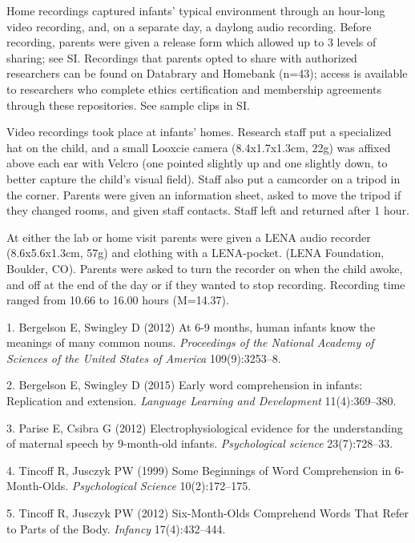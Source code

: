 \documentclass[9pt,twocolumn,twoside,]{pnas-new}
\begin{document}
Home recordings captured infants' typical environment through an
hour-long video recording, and, on a separate day, a daylong audio
recording. Before recording, parents were given a release form which
allowed up to 3 levels of sharing; see SI. Recordings that parents opted
to share with authorized researchers can be found on Databrary and
Homebank (n=43); access is available to researchers who complete ethics
certification and membership agreements through these repositories. See
sample clips in SI.

Video recordings took place at infants' homes. Research staff put a
specialized hat on the child, and a small Looxcie camera (8.4x1.7x1.3cm,
22g) was affixed above each ear with Velcro (one pointed slightly up and
one slightly down, to better capture the child's visual field). Staff
also put a camcorder on a tripod in the corner. Parents were given an
information sheet, asked to move the tripod if they changed rooms, and
given staff contacts. Staff left and returned after 1 hour.

At either the lab or home visit parents were given a LENA audio recorder
(8.6x5.6x1.3cm, 57g) and clothing with a LENA-pocket. (LENA Foundation,
Boulder, CO). Parents were asked to turn the recorder on when the child
awoke, and off at the end of the day or if they wanted to stop
recording. Recording time ranged from 10.66 to 16.00 hours (M=14.37).

\showmatmethods
\showacknow  \newline

\hypertarget{refs}{}
\hypertarget{ref-Bergelson2012}{}
1. Bergelson E, Swingley D (2012) At 6-9 months, human infants know the
meanings of many common nouns. \emph{Proceedings of the National Academy
of Sciences of the United States of America} 109(9):3253--8.

\hypertarget{ref-Bergelson2015b}{}
2. Bergelson E, Swingley D (2015) Early word comprehension in infants:
Replication and extension. \emph{Language Learning and Development}
11(4):369--380.

\hypertarget{ref-Parise2012}{}
3. Parise E, Csibra G (2012) Electrophysiological evidence for the
understanding of maternal speech by 9-month-old infants.
\emph{Psychological science} 23(7):728--33.

\hypertarget{ref-Tincoff1999}{}
4. Tincoff R, Jusczyk PW (1999) Some Beginnings of Word Comprehension in
6-Month-Olds. \emph{Psychological Science} 10(2):172--175.

\hypertarget{ref-Tincoff2012}{}
5. Tincoff R, Jusczyk PW (2012) Six-Month-Olds Comprehend Words That
Refer to Parts of the Body. \emph{Infancy} 17(4):432--444.
\end{document}
